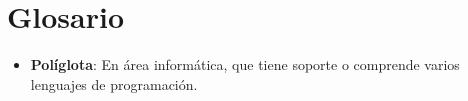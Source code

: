 \newpage
\section*{Glosario}
\begin{itemize}  
  \item \textbf{Políglota}: En área informática, que tiene soporte o comprende varios lenguajes de programación.  
\end{itemize}
